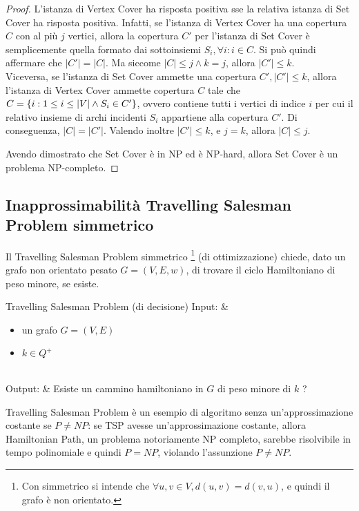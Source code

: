 \begin{proof}
    L'istanza di Vertex Cover ha risposta positiva sse la relativa istanza di
    Set Cover ha risposta positiva.
    Infatti, se l'istanza di Vertex Cover ha una copertura $C$ con al più
    $j$ vertici, allora la copertura $C'$ per l'istanza di Set Cover è
    semplicemente quella formato dai sottoinsiemi $S_i, \forall i : i \in C$.
    Si può quindi affermare che $|C'| = |C|$.
    Ma siccome $|C| \le j \land k = j$, allora $|C'| \le k$.\\
    Viceversa, se l'istanza di Set Cover ammette una copertura $C', |C'| \le k$,
    allora l'istanza di Vertex Cover ammette copertura $C$ tale che
    $C = \left\{i : 1 \le i \le |V| \land S_i \in C'\right\}$, ovvero contiene tutti
    i vertici di indice $i$ per cui il relativo insieme di archi incidenti
    $S_i$ appartiene alla copertura $C'$. Di conseguenza, $|C| = |C'|$.
    Valendo inoltre $|C'| \le k$, e $j = k$, allora $|C| \le j$.

    Avendo dimostrato che Set Cover è in NP ed è NP-hard, allora Set Cover è
    un problema NP-completo.
\end{proof}

\subsection{Inapprossimabilità Travelling Salesman Problem simmetrico}
Il Travelling Salesman Problem simmetrico \footnote{Con simmetrico si intende
che $\forall u, v \in V, d(u,v)=d(v,u)$, e quindi il grafo è non orientato.}
(di ottimizzazione) chiede, dato un grafo non orientato pesato $G = (V, E, w)$,
di trovare il ciclo Hamiltoniano di peso minore, se esiste.
\begin{problem}[lined]{Travelling Salesman Problem (di decisione)}
    Input: & \begin{minipage}[t]{0.8\linewidth}\begin{itemize}
        \setlength\itemsep{0em}
        \item un grafo $G = (V, E)$
        \item $k \in Q^+$
    \end{itemize}\end{minipage}\\
    Output: & Esiste un cammino hamiltoniano in $G$ di peso minore di $k$ ?
\end{problem}

Travelling Salesman Problem è un esempio di algoritmo senza un'approssimazione
costante se $P \neq NP$: se TSP avesse un'approssimazione costante,
allora Hamiltonian Path, un problema notoriamente NP completo, sarebbe
risolvibile in tempo polinomiale e quindi $P = NP$, violando l'assunzione
$P \neq NP$.

